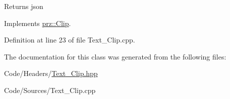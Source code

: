 \begin{DoxyReturn}{Returns}
json 
\end{DoxyReturn}


Implements \mbox{\hyperlink{classprz_1_1_clip_a4959ada0fab0fbac6cb5239578ac3ec6}{prz\+::\+Clip}}.



Definition at line 23 of file Text\+\_\+\+Clip.\+cpp.



The documentation for this class was generated from the following files\+:\begin{DoxyCompactItemize}
\item 
Code/\+Headers/\mbox{\hyperlink{_text___clip_8hpp}{Text\+\_\+\+Clip.\+hpp}}\item 
Code/\+Sources/Text\+\_\+\+Clip.\+cpp\end{DoxyCompactItemize}
